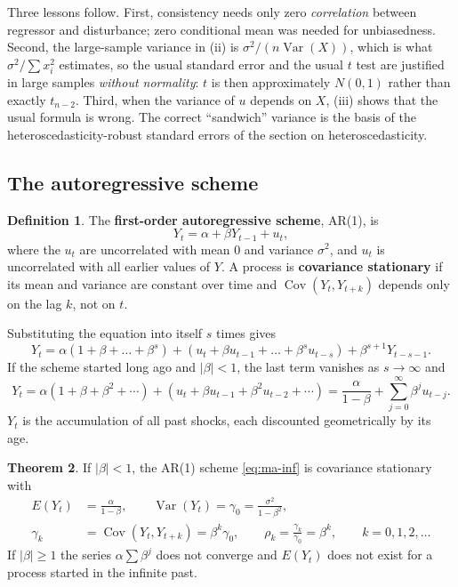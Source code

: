 \documentclass[11pt,a4paper]{article}
\numberwithin{equation}{section}
\DeclareMathOperator{\Var}{Var}
\DeclareMathOperator{\Cov}{Cov}
\theoremstyle{definition}
\newtheorem{thm}{Theorem}[subsection]
\newtheorem{defn}[thm]{Definition}
\begin{document}
Three lessons follow. First, consistency needs only zero \emph{correlation} between regressor and disturbance; zero conditional mean was needed for
unbiasedness. Second, the large-sample variance in (ii) is $\sigma^2/(n\Var(X))$, which is what $\sigma^2/\sum x_i^2$ estimates, so the usual standard
error and the usual $t$ test are justified in large samples \emph{without normality}: $t$ is then approximately $N(0, 1)$ rather than exactly
$t_{n-2}$. Third, when the variance of $u$ depends on $X$, (iii) shows that the usual formula is wrong. The correct ``sandwich'' variance is the basis
of the heteroscedasticity-robust standard errors of the section on heteroscedasticity.

\subsection{The autoregressive scheme}
\label{ssec:ar1}

\begin{defn}
The \textbf{first-order autoregressive scheme}, AR(1), is
\[
Y_t = \alpha + \beta Y_{t-1} + u_t ,
\]
where the $u_t$ are uncorrelated with mean $0$ and variance $\sigma^2$, and $u_t$ is uncorrelated with all earlier values of $Y$. A process is
\textbf{covariance stationary} if its mean and variance are constant over time and $\Cov(Y_t, Y_{t+k})$ depends only on the lag $k$, not on $t$.
\end{defn}

Substituting the equation into itself $s$ times gives
\[
Y_t = \alpha(1 + \beta + \dots + \beta^{s}) + (u_t + \beta u_{t-1} + \dots + \beta^{s}u_{t-s}) + \beta^{s+1}Y_{t-s-1} .
\]
If the scheme started long ago and $|\beta| < 1$, the last term vanishes as $s \to \infty$ and
\begin{equation}
\label{eq:ma-inf}
Y_t = \alpha(1 + \beta + \beta^2 + \cdots) + (u_t + \beta u_{t-1} + \beta^2u_{t-2} + \cdots) = \frac{\alpha}{1 - \beta} + \sum_{j=0}^\infty \beta^ju_{t-j} .
\end{equation}
$Y_t$ is the accumulation of all past shocks, each discounted geometrically by its age.

\begin{thm}
\label{thm:ar1}
If $|\beta| < 1$, the AR(1) scheme \eqref{eq:ma-inf} is covariance stationary with
\begin{align*}
E(Y_t) &= \frac{\alpha}{1 - \beta}, \qquad \Var(Y_t) = \gamma_0 = \frac{\sigma^2}{1 - \beta^2},\\
\gamma_k &= \Cov(Y_t, Y_{t+k}) = \beta^k\gamma_0, \qquad \rho_k = \frac{\gamma_k}{\gamma_0} = \beta^k, \qquad k = 0, 1, 2, \dots
\end{align*}
If $|\beta| \geq 1$ the series $\alpha\sum\beta^j$ does not converge and $E(Y_t)$ does not exist for a process started in the infinite past.
\end{thm}
\end{document}
